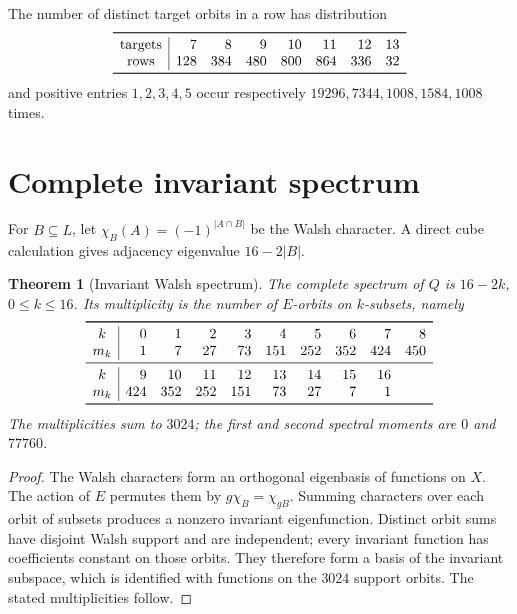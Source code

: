 \documentclass[10pt]{article}
\newtheorem{theorem}{Theorem}
\begin{document}
The number of distinct target orbits in a row has distribution
\[
\begin{array}{c|rrrrrrr}
\toprule
\text{targets}&7&8&9&10&11&12&13\\
\text{rows}&128&384&480&800&864&336&32\\
\bottomrule
\end{array}
\]
and positive entries $1,2,3,4,5$ occur respectively
$19296,7344,1008,1584,1008$ times.

\section{Complete invariant spectrum}
For $B\subseteq L$, let
$\chi_B(A)=(-1)^{|A\cap B|}$ be the Walsh character.  A direct cube
calculation gives adjacency eigenvalue $16-2|B|$.

\begin{theorem}[Invariant Walsh spectrum]
The complete spectrum of $Q$ is $16-2k$, $0\leq k\leq16$.  Its
multiplicity is the number of $E$-orbits on $k$-subsets, namely
\[
\begin{array}{c|rrrrrrrrr}
\toprule
k&0&1&2&3&4&5&6&7&8\\
m_k&1&7&27&73&151&252&352&424&450\\
\midrule
k&9&10&11&12&13&14&15&16\\
m_k&424&352&252&151&73&27&7&1\\
\bottomrule
\end{array}
\]
The multiplicities sum to $3024$; the first and second spectral moments are
$0$ and $77760$.
\end{theorem}
\begin{proof}
The Walsh characters form an orthogonal eigenbasis of functions on $X$.
The action of $E$ permutes them by $g\chi_B=\chi_{gB}$.  Summing characters
over each orbit of subsets produces a nonzero invariant eigenfunction.
Distinct orbit sums have disjoint Walsh support and are independent; every
invariant function has coefficients constant on those orbits.  They
therefore form a basis of the invariant subspace, which is identified with
functions on the $3024$ support orbits.  The stated multiplicities follow.
\end{proof}
\end{document}
